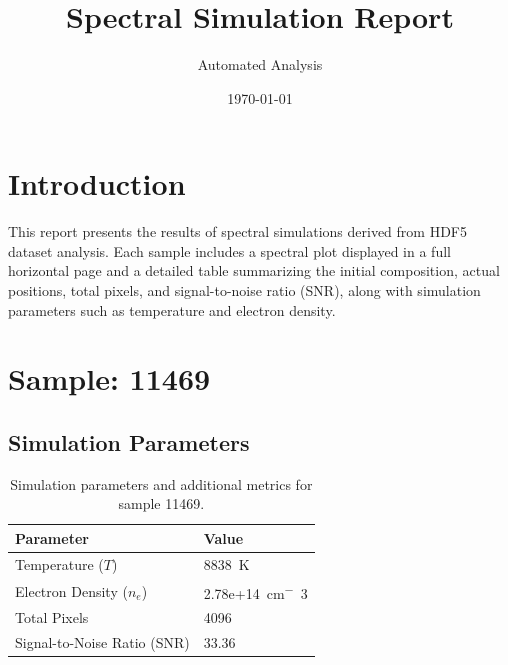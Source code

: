 \documentclass[a4paper,11pt]{article}
\title{Spectral Simulation Report}
\author{Automated Analysis}
\date{\today}
\begin{document}
\maketitle
\tableofcontents
\clearpage

\section{Introduction}
This report presents the results of spectral simulations derived from HDF5 dataset analysis. Each sample includes a spectral plot displayed in a full horizontal page and a detailed table summarizing the initial composition, actual positions, total pixels, and signal-to-noise ratio (SNR), along with simulation parameters such as temperature and electron density.


\section{Sample: 11469}
\subsection{Simulation Parameters}
\begin{table}[h!]
    \centering
    \begin{tabular}{ll}
        \toprule
        \textbf{Parameter} & \textbf{Value} \\
        \midrule
        Temperature ($T$) & 8838 \,\si{K} \\
        Electron Density ($n_e$) & 2.78e+14 \,\si{cm^-3} \\
        Total Pixels & 4096 \\
        Signal-to-Noise Ratio (SNR) & 33.36 \\
        \bottomrule
    \end{tabular}
    \caption{Simulation parameters and additional metrics for sample 11469.}
    \label{tab:params_11469}
\end{table}
\end{document}
